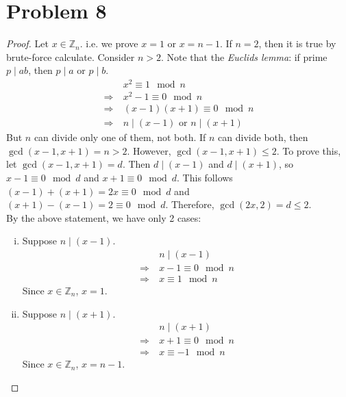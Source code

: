 \section*{Problem 8}
	\begin{proof}
		Let $x\in \mathbb{Z}_n$. i.e. we prove $x = 1$ or $x = n - 1$. If $n = 2$, then it is true by brute-force calculate. Consider $n > 2$. Note that the \textit{Euclid\textquotesingle s lemma}: if prime $p \mid ab$, then $p \mid a$ or $p \mid b$.
		\begin{align*}
			&x^2 \equiv 1 \mod n\\
			\Rightarrow\ &x^2 - 1 \equiv 0 \mod n\\
			\Rightarrow\ &(x - 1)(x + 1) \equiv 0 \mod n\\
			\Rightarrow\ & n \mid (x - 1) \mbox{ or } n \mid (x + 1)
		\end{align*}
		But $n$ can divide only one of them, not both. If $n$ can divide both, then $\gcd(x - 1, x + 1) = n > 2$. However, $\gcd(x - 1, x + 1) \leq 2$. To prove this, let $\gcd(x - 1, x + 1) = d$. Then $d \mid (x - 1)$ and $d \mid (x + 1)$, so $x - 1 \equiv 0 \mod d$ and $x + 1 \equiv 0 \mod d$. This follows $(x - 1) + (x + 1) = 2x \equiv 0 \mod d$ and $(x + 1) - (x - 1) = 2 \equiv 0 \mod d$. Therefore, $\gcd(2x, 2) = d \leq 2$.\\
		By the above statement, we have only 2 cases:
		\begin{enumerate} [i)]
			\item Suppose $n \mid (x - 1)$.
			\begin{align*}
				&n \mid (x - 1)\\
				\Rightarrow\ &x - 1 \equiv 0 \mod n\\
				\Rightarrow\ &x \equiv 1 \mod n
			\end{align*}
			Since $x\in \mathbb{Z}_n$, $x = 1$.
			\item Suppose $n \mid (x + 1)$.
			\begin{align*}
				&n \mid (x + 1)\\
				\Rightarrow\ &x + 1 \equiv 0 \mod n\\
				\Rightarrow\ &x \equiv -1 \mod n
			\end{align*}
			Since $x\in \mathbb{Z}_n$, $x = n - 1$.
		\end{enumerate}
	\end{proof}